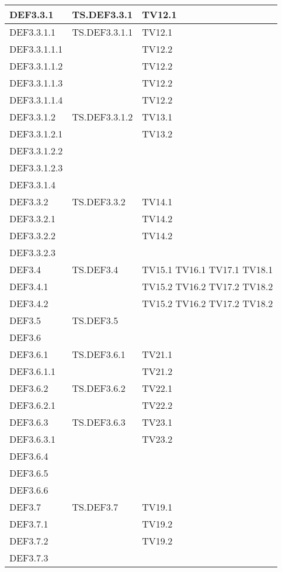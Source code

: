 \documentclass{scalatekids-article}
\begin{document}
\begin{longtable}[H]{|l|p{4cm}|p{4cm}|}
  \hline
  DEF3.3.1 & TS.DEF3.3.1 & TV12.1\\
  \hline
  DEF3.3.1.1 & TS.DEF3.3.1.1 & TV12.1\\
  \hline
  DEF3.3.1.1.1 & & TV12.2\\
  \hline
  DEF3.3.1.1.2 & & TV12.2\\
  \hline
  DEF3.3.1.1.3 & & TV12.2\\
  \hline
  DEF3.3.1.1.4 & & TV12.2\\
  \hline
  DEF3.3.1.2 & TS.DEF3.3.1.2 & TV13.1\\
  \hline
  DEF3.3.1.2.1 & & TV13.2\\
  \hline
  DEF3.3.1.2.2 & & \\
  \hline
  DEF3.3.1.2.3 & & \\
  \hline
  DEF3.3.1.4 & & \\
  \hline
  DEF3.3.2 & TS.DEF3.3.2 & TV14.1\\
  \hline
  DEF3.3.2.1 & & TV14.2\\
  \hline
  DEF3.3.2.2 & & TV14.2\\
  \hline
  DEF3.3.2.3 & & \\ %
  \hline
  DEF3.4 & TS.DEF3.4 & TV15.1 TV16.1 TV17.1 TV18.1\\
  \hline
  DEF3.4.1 & & TV15.2 TV16.2 TV17.2 TV18.2\\
  \hline
  DEF3.4.2 & & TV15.2 TV16.2 TV17.2 TV18.2\\
  \hline
  DEF3.5 & TS.DEF3.5 & \\
  \hline
  DEF3.6 & & \\
  \hline
  DEF3.6.1 & TS.DEF3.6.1 & TV21.1\\
  \hline
  DEF3.6.1.1 & & TV21.2\\
  \hline
  DEF3.6.2 & TS.DEF3.6.2 & TV22.1\\
  \hline
  DEF3.6.2.1 & & TV22.2\\
  \hline
  DEF3.6.3 & TS.DEF3.6.3 & TV23.1\\
  \hline
  DEF3.6.3.1 & & TV23.2\\
  \hline
  DEF3.6.4 & & \\ %
  \hline
  DEF3.6.5 & & \\ %
  \hline
  DEF3.6.6 & & \\ %
  \hline
  DEF3.7 & TS.DEF3.7 & TV19.1\\
  \hline
  DEF3.7.1 & & TV19.2\\
  \hline
  DEF3.7.2 & & TV19.2\\
  \hline
  DEF3.7.3 & & \\

\end{longtable}
\end{document}
